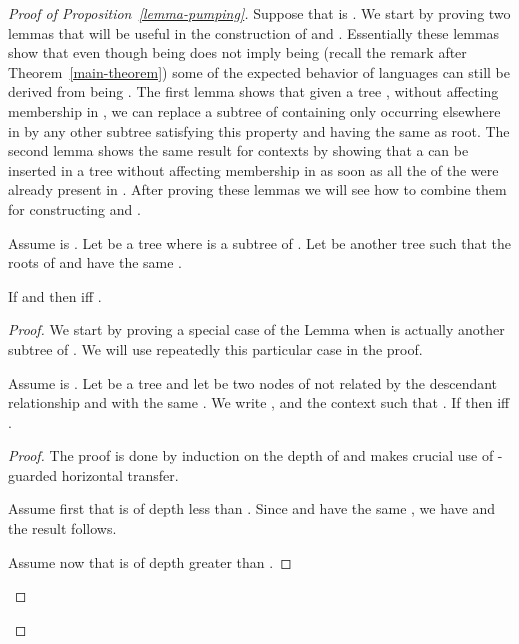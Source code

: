 \begin{proof}[Proof of Proposition~\ref{lemma-pumping}]

  Suppose that  is \ktame. We start by proving two lemmas that will be
  useful in the construction of  and . Essentially these lemmas show
  that even though being \ktame does not imply being  (recall
  the remark after Theorem~\ref{main-theorem}) some of the expected behavior of
   languages can still be derived from being \ktame. The first
  lemma shows that given a tree , without affecting membership in , we
  can replace a subtree of  containing only  occurring elsewhere
  in  by any other subtree satisfying this property and having the same
  \ktype as root. The second lemma shows the same result for contexts by
  showing that a \kloop can be inserted in a tree  without affecting
  membership in  as soon as all the  of the \kloop were
  already present in . After proving these lemmas we will see how to
  combine them for constructing  and .

\begin{lem}\label{claim-transfer-branch} 
  Assume  is \ktame.  Let  be a tree where  is a subtree of .
  Let  be another tree such that the roots of  and  have the same
  \ktype.

If  and  then
 iff .
\end{lem}

\begin{proof}

  We start by proving a special case of the Lemma when  is actually another
  subtree of . We will use repeatedly this particular case in the proof.

  \begin{claim} \label{claim-transfer-enhanced} Assume  is \ktame. Let 
    be a tree and let  be two nodes of  not related by the descendant
    relationship and with the same \ktype. We write ,
     and  the context such that .
    If  then  iff .
\end{claim}


\begin{proof} The proof is done by induction on the depth of  and makes
  crucial use of -guarded horizontal transfer.

  Assume first that  is of depth less than . Since  and  have the same
  \ktype, we have  and the result follows.

  Assume now that  is of depth greater than .
 

\end{proof}
\end{proof}
\end{proof}
